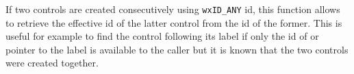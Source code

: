 \label{wxwindownextcontrolid}


If two controls are created consecutively using \texttt{wxID\_ANY} id, this
function allows to retrieve the effective id of the latter control from the id
of the former. This is useful for example to find the control following its 
 label if only the id of or pointer to the
label is available to the caller but it is known that the two controls were
created together.




